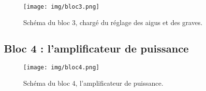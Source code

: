\documentclass{article}
\begin{document}
\begin{figure}[h]
	\centering
	\texttt{[image: img/bloc3.png]}
	\caption{Schéma du bloc 3, chargé du réglage des aigus et des graves.}
	\label{bloc3}
\end{figure}



\subsection{Bloc 4 : l'amplificateur de puissance}

\begin{figure}[h]
	\centering
	\texttt{[image: img/bloc4.png]}
	\caption{Schéma du bloc 4, l'amplificateur de puissance.}
	\label{bloc4}
\end{figure}

\end{document}
